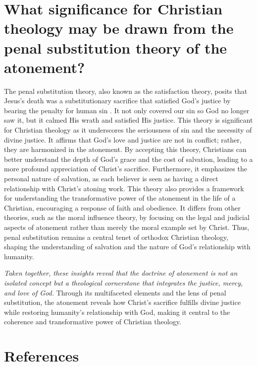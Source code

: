 \documentclass[stu,12pt,floatsintext]{apa7}
\begin{document}
\section{What significance for Christian theology may be drawn from the penal substitution theory of the atonement?}

The penal substitution theory, also known as the satisfaction theory, posits that Jesus's death was a substitutionary sacrifice that satisfied God's justice by bearing the penalty for human sin \parencite[pp. 279-280]{ericksonIntroducingChristianDoctrine2015}. It not only covered our sin so God no longer saw it, but it calmed His wrath and satisfied His justice. This theory is significant for Christian theology as it underscores the seriousness of sin and the necessity of divine justice. It affirms that God's love and justice are not in conflict; rather, they are harmonized in the atonement. By accepting this theory, Christians can better understand the depth of God's grace and the cost of salvation, leading to a more profound appreciation of Christ's sacrifice. Furthermore, it emphasizes the personal nature of salvation, as each believer is seen as having a direct relationship with Christ's atoning work. This theory also provides a framework for understanding the transformative power of the atonement in the life of a Christian, encouraging a response of faith and obedience. It differs from other theories, such as the moral influence theory, by focusing on the legal and judicial aspects of atonement rather than merely the moral example set by Christ. Thus, penal substitution remains a central tenet of orthodox Christian theology, shaping the understanding of salvation and the nature of God's relationship with humanity.

\textit{Taken together, these insights reveal that the doctrine of atonement is not an isolated concept but a theological cornerstone that integrates the justice, mercy, and love of God.} Through its multifaceted elements and the lens of penal substitution, the atonement reveals how Christ’s sacrifice fulfills divine justice while restoring humanity’s relationship with God, making it central to the coherence and transformative power of Christian theology.

\section{References}

\printbibliography
\end{document}
